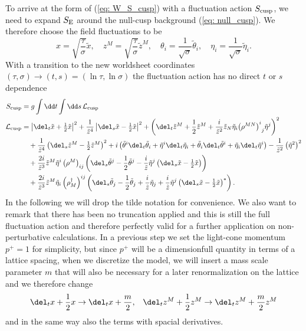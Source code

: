 %
%
To arrive at the form of (\ref{eq: W_S_cusp}) with a fluctuation action $S_{\rm cusp}$, we need to expand $S_{\rm E}$ around the null-cusp background (\ref{eq: null_cusp}). We therefore choose the field fluctuations to be
%
%
\begin{equation}
x=\sqrt{\frac{\tau}{\sigma}}\tilde{x}, \quad z^{M}=\sqrt{\frac{\tau}{\sigma}}\tilde{z}^{M}, \quad \theta_{i}=\frac{1}{\sqrt{\sigma}}\tilde{\theta}_{i}, \quad \eta_{i} = \frac{1}{\sqrt{\sigma}}\tilde{\eta}_{i}.
\end{equation}
%
%
With a transition to the new worldsheet coordinates ${(\tau,\sigma)\to (t,s)=(\ln\tau , \ln \sigma)}$ the fluctuation action has no direct $t$ or $s$ dependence
%
%
\begin{align}
S_{\rm cusp} &= g \int \dd t \int \dd s \, \mathcal{L}_{\rm cusp} \label{eq: cusp_action} \\
%
%
\mathcal{L}_{\rm cusp} &= \left\vert \del_{t}\tilde{x} + \tfrac{1}{2}\tilde{x} \right\vert^{2} + \frac{1}{\tilde{z}^{4}}\left\vert \del_{s}\tilde{x} - \tfrac{1}{2}\tilde{x} \right\vert^{2} + \left( \del_{t}\tilde{z}^{M} + \frac{1}{2}\tilde{z}^{M} + \frac{i}{\tilde{z}^{2}}\tilde{z}_{N}\tilde{\eta}_{i} {\left(\rho^{MN}\right)^{i}}_{j} \tilde{\eta}^{j}\right)^{2} \notag \\
%
%
&\quad +\frac{1}{\tilde{z}^{4}}\left( \del_{s}\tilde{z}^{M} - \tfrac{1}{2} \tilde{z}^{M}\right)^{2} + i \left( \tilde{\theta}^{i}\del_{t}\tilde{\theta}_{i} + \tilde{\eta}^{i}\del_{t}\tilde{\eta}_{i} + \tilde{\theta}_{i}\del_{t}\tilde{\theta}^{i} + \tilde{\eta}_{i}\del_{t}\tilde{\eta}^{i}\right) - \frac{1}{\tilde{z}^{2}}\left(\tilde{\eta}^{2}\right)^{2} \notag \\
%
%
&\quad + \frac{2i}{\tilde{z}^{3}}\tilde{z}^{M}\tilde{\eta}^{i} \left(\rho^{M}\right)_{ij} \left( \del_{s}\tilde{\theta}^{j} - \frac{1}{2}\tilde{\theta}^{j} - \frac{i}{\tilde{z}} \tilde{\eta}^{j} \left(\del_{s}\tilde{x}- \tfrac{1}{2}\tilde{x}\right)\right) \notag \\
%
%
&\quad + \frac{2i}{\tilde{z}^{3}}\tilde{z}^{M}\tilde{\eta}_{i}\left(\rho_{M}^{\dagger}\right)^{ij} \left( \del_{s}\tilde{\theta}_{j} - \frac{1}{2} \tilde{\theta}_{j} + \frac{i}{\tilde{z}}\tilde{\eta}_{j} + \frac{i}{\tilde{z}} \tilde{\eta}^{j} \left(\del_{s}\tilde{x}- \tfrac{1}{2}\tilde{x}\right)^{*} \right). \notag
\end{align}
%
%
In the following we will drop the tilde notation for convenience. We also want to remark that there has been no truncation applied and this is still the full fluctuation action and therefore perfectly valid for a further application on non-perturbative calculations. In a previous step we set the light-cone momentum $p^{+}=1$ for simplicity, but since $p^{+}$ will be a dimensionfull quantity in terms of a lattice spacing, when we discretize the model, we will insert a mass scale parameter $m$ that will also be necessary for a later renormalization on the lattice and we therefore change
%
%
\begin{align}
\del_{t}x +\frac{1}{2}x &\to \del_{t}x +\frac{m}{2}, & \del_{t}z^{M}+\frac{1}{2}z^{M} \to \del_{t}z^{M}+\frac{m}{2}z^{M}
\end{align}
%
%
and in the same way also the terms with spacial derivatives.
%
%
%
%
%
%
%
%
%
